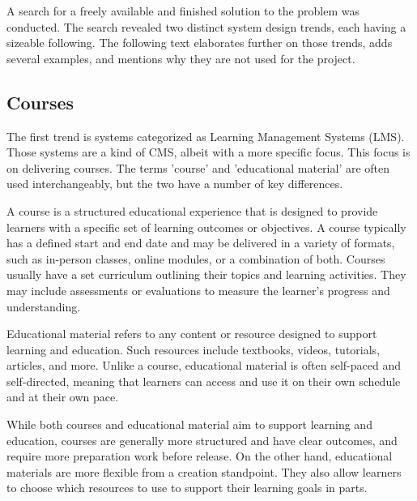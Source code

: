 \documentclass[
  digital,     %
  oneside,     %
  nosansbold,  %
  colorbold, %
  lof,         %
  lot,         %
]{fithesis4}
\begin{document}
A search for a freely available and finished solution to the problem was conducted. The search revealed two distinct system design trends, each having a sizeable following. The following text elaborates further on those trends, adds several examples, and mentions why they are not used for the project.

\subsection{Courses}

The first trend is systems categorized as Learning Management Systems (LMS). Those systems are a kind of CMS, albeit with a more specific focus. This focus is on delivering courses. The terms 'course' and 'educational material' are often used interchangeably, but the two have a number of key differences.

A course is a structured educational experience that is designed to provide learners with a specific set of learning outcomes or objectives. A course typically has a defined start and end date and may be delivered in a variety of formats, such as in-person classes, online modules, or a combination of both. Courses usually have a set curriculum outlining their topics and learning activities. They may include assessments or evaluations to measure the learner's progress and understanding.

Educational material refers to any content or resource designed to support learning and education. Such resources include textbooks, videos, tutorials, articles, and more. Unlike a course, educational material is often self-paced and self-directed, meaning that learners can access and use it on their own schedule and at their own pace.

While both courses and educational material aim to support learning and education, courses are generally more structured and have clear outcomes, and require more preparation work before release. On the other hand, educational materials are more flexible from a creation standpoint. They also allow learners to choose which resources to use to support their learning goals in parts.
\end{document}
